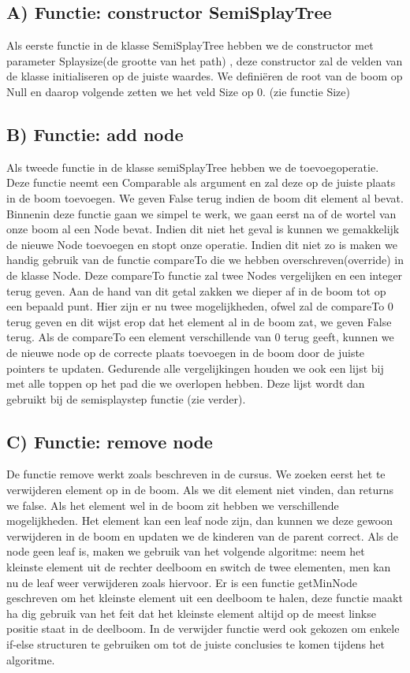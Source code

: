 \documentclass[dutch, 11pt]{report}
\begin{document}
\subsection*{A) Functie: constructor SemiSplayTree}
Als eerste functie in de klasse SemiSplayTree hebben we de constructor met parameter Splaysize(de grootte van het path) , deze constructor zal de velden van de klasse initialiseren op de juiste waardes. We definiëren de root van de boom op Null en daarop volgende zetten we het veld Size op 0. (zie functie Size)

\subsection*{B) Functie: add node}
Als tweede functie in de klasse semiSplayTree hebben we de toevoegoperatie. Deze functie neemt een Comparable als argument en zal deze op de juiste plaats in de boom toevoegen. We geven False terug indien de boom dit element al bevat. Binnenin deze functie gaan we simpel te werk, we gaan eerst na of de wortel van onze boom al een Node bevat. Indien dit niet het geval is kunnen we gemakkelijk de nieuwe Node toevoegen en stopt onze operatie. Indien dit niet zo is maken we handig gebruik van de functie compareTo die we hebben overschreven(override) in de klasse Node. Deze compareTo functie zal twee Nodes vergelijken en een integer terug geven. Aan de hand van dit getal zakken we dieper af in de boom tot op een bepaald punt. Hier zijn er nu twee mogelijkheden, ofwel zal de compareTo 0 terug geven en dit wijst erop dat het element al in de boom zat, we geven False terug. Als de compareTo een element verschillende van 0 terug geeft, kunnen we de nieuwe node op de correcte plaats toevoegen in de boom door de juiste pointers te updaten. Gedurende alle vergelijkingen houden we ook een lijst bij met alle toppen op het pad die we overlopen hebben. Deze lijst wordt dan gebruikt bij de semisplaystep functie (zie verder).

\subsection*{C) Functie: remove node}
De functie remove werkt zoals beschreven in de cursus. We zoeken eerst het te verwijderen element op in de boom. Als we dit element niet vinden, dan returns we false. Als het element wel in de boom zit hebben we verschillende mogelijkheden. Het element kan een leaf node zijn, dan kunnen we deze gewoon verwijderen in de boom en updaten we de kinderen van de parent correct. Als de node geen leaf is, maken we gebruik van het volgende algoritme: neem het kleinste element uit de rechter deelboom en switch de twee elementen, men kan nu de leaf weer verwijderen zoals hiervoor. Er is een functie getMinNode geschreven om het kleinste element uit een deelboom te halen, deze functie maakt ha dig gebruik van het feit dat het kleinste element altijd op de meest linkse positie staat in de deelboom. In de verwijder functie werd ook gekozen om enkele if-else structuren te gebruiken om tot de juiste conclusies te komen tijdens het algoritme.
\end{document}
